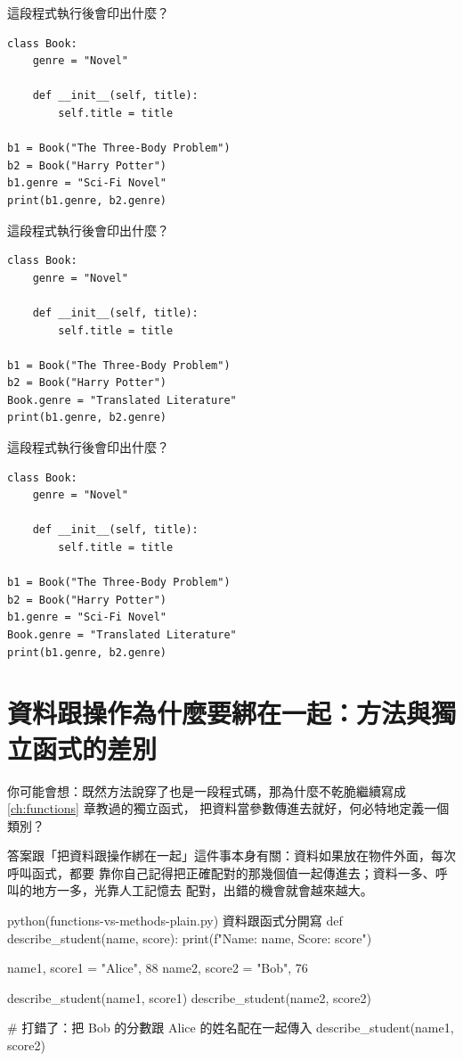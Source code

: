 \begin{drills}[label=drills:instance-vs-class-attr]
\item 這段程式執行後會印出什麼？
\begin{verbatim}
class Book:
    genre = "Novel"

    def __init__(self, title):
        self.title = title

b1 = Book("The Three-Body Problem")
b2 = Book("Harry Potter")
b1.genre = "Sci-Fi Novel"
print(b1.genre, b2.genre)
\end{verbatim}
\item 這段程式執行後會印出什麼？
\begin{verbatim}
class Book:
    genre = "Novel"

    def __init__(self, title):
        self.title = title

b1 = Book("The Three-Body Problem")
b2 = Book("Harry Potter")
Book.genre = "Translated Literature"
print(b1.genre, b2.genre)
\end{verbatim}
\item 這段程式執行後會印出什麼？
\begin{verbatim}
class Book:
    genre = "Novel"

    def __init__(self, title):
        self.title = title

b1 = Book("The Three-Body Problem")
b2 = Book("Harry Potter")
b1.genre = "Sci-Fi Novel"
Book.genre = "Translated Literature"
print(b1.genre, b2.genre)
\end{verbatim}
\end{drills}

\section{資料跟操作為什麼要綁在一起：方法與獨立函式的差別}
\label{sec:methods-vs-functions}

你可能會想：既然方法說穿了也是一段程式碼，那為什麼不乾脆繼續寫成 \ref{ch:functions} 章教過的獨立函式，
把資料當參數傳進去就好，何必特地定義一個類別？

答案跟「把資料跟操作綁在一起」這件事本身有關：資料如果放在物件外面，每次呼叫函式，都要
靠你自己記得把正確配對的那幾個值一起傳進去；資料一多、呼叫的地方一多，光靠人工記憶去
配對，出錯的機會就會越來越大。

\begin{example}{python}{(functions-vs-methods-plain.py) 資料跟函式分開寫}
def describe_student(name, score):
    print(f"Name: {name}, Score: {score}")


name1, score1 = "Alice", 88
name2, score2 = "Bob", 76

describe_student(name1, score1)
describe_student(name2, score2)

# 打錯了：把 Bob 的分數跟 Alice 的姓名配在一起傳入
describe_student(name1, score2)
\end{example}

